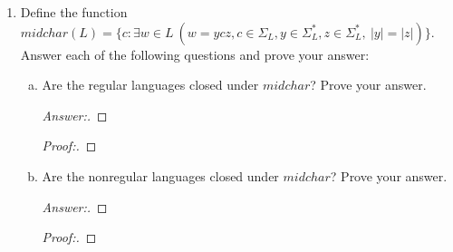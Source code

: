 \documentclass[10pt]{article}
\newcommand{\card}[1]{\left| #1 \right|}
\begin{document}
\begin{enumerate}[1)]
\begin{enumerate}[a)]
\item
$maxstring(A^nB^n)$.
\begin{proof}[Answer:]
\end{proof}

\item
$maxstring(a^ib^jc^k, 1 \leq k \leq j \leq i)$.
\begin{proof}[Answer:]
\end{proof}

\item
$maxstring(L_1L_2)$, where $L_1 = \{w \in \{a, b\}^*$ : $w$ contains exactly one $a$\} and $L_2 = \{a\}$.
\begin{proof}[Answer:]
\end{proof}

\item
$mix((aba)^*)$.
\begin{proof}[Answer:]
\end{proof}

\item
$mix(a^*b^*)$.
\begin{proof}[Answer:]
\end{proof}
\end{enumerate}


\item
Define the function $midchar(L) = \{c : \exists w \in L\ (w = ycz, c \in \Sigma _L, y \in \Sigma _L^*, z \in \Sigma _L^*,\ \card{y} = \card{z})\}$.  Answer each of the following questions and prove your answer:

\begin{enumerate}[a)]
\item
Are the regular languages closed under $midchar$?  Prove your answer.
\begin{proof}[Answer:]
\end{proof}
\begin{proof}[Proof:]
\end{proof}

\item
Are the nonregular languages closed under $midchar$?  Prove your answer.
\begin{proof}[Answer:]
\end{proof}
\begin{proof}[Proof:]
\end{proof}
\end{enumerate}


\end{enumerate}
\end{document}
